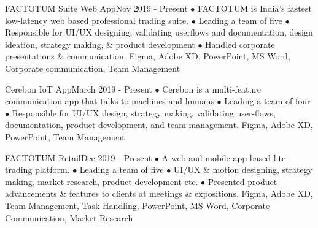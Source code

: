 %
%
%

\begin{projects}
  \project
    {FACTOTUM Suite Web App}{Nov 2019 - Present}
    { }
    {$\bullet$ FACTOTUM is India's fastest low-latency web based professional trading suite. $\bullet$ Leading a team of five $\bullet$ Responsible for UI/UX designing, validating userflows and documentation, design ideation, strategy making, \& product development $\bullet$ Handled corporate presentations \& communication.}
    {Figma, Adobe XD, PowerPoint, MS Word, Corporate communication, Team Management}
    
    \project
    {Cerebon IoT App}{March 2019 - Present}
    {}
    {$\bullet$ Cerebon is a multi-feature communication app that talks to machines and humans $\bullet$ Leading a team of four $\bullet$ Responsible for UI/UX design, strategy making, validating user-flows, documentation, product development, and team management.}
    {Figma, Adobe XD, PowerPoint, Team Management}
    
  \project
    {FACTOTUM Retail}{Dec 2019 - Present}
    { }
    {$\bullet$ A web and mobile app based lite trading platform. $\bullet$ Leading a team of five $\bullet$ UI/UX \& motion designing, strategy making, market research, product development etc. $\bullet$ Presented product advancements \& features to clients at meetings \& expositions.}
    {Figma, Adobe XD, Team Management, Task Handling, PowerPoint, MS Word, Corporate Communication, Market Research}
    

\end{projects}
